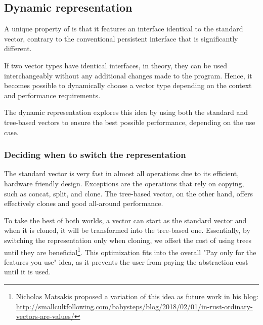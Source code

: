 

\subsection{Dynamic representation}

A unique property of \pvec{} is that it features an interface identical to the standard vector, contrary to the conventional persistent interface that is significantly different.

If two vector types have identical interfaces, in theory, they can be used interchangeably without any additional changes made to the program. Hence, it becomes possible to dynamically choose a vector type depending on the context and performance requirements.

The dynamic representation explores this idea by using both the standard and tree-based vectors to ensure the best possible performance, depending on the use case.

\subsubsection*{Deciding when to switch the representation}
The standard vector is very fast in almost all operations due to its efficient, hardware friendly design. Exceptions are the operations that rely on copying, such as concat, split, and clone. The tree-based vector, on the other hand, offers effectively  clones and good all-around performance.

To take the best of both worlds, a vector can start as the standard vector and when it is cloned, it will be transformed into the tree-based one. Essentially, by switching the representation only when cloning, we offset the cost of using trees until they are beneficial\footnote{Nicholas Matsakis proposed a variation of this idea as future work in his blog: \url{http://smallcultfollowing.com/babysteps/blog/2018/02/01/in-rust-ordinary-vectors-are-values/}}. This optimization fits into the overall "Pay only for the features you use" idea, as it prevents the user from paying the abstraction cost until it is used.

